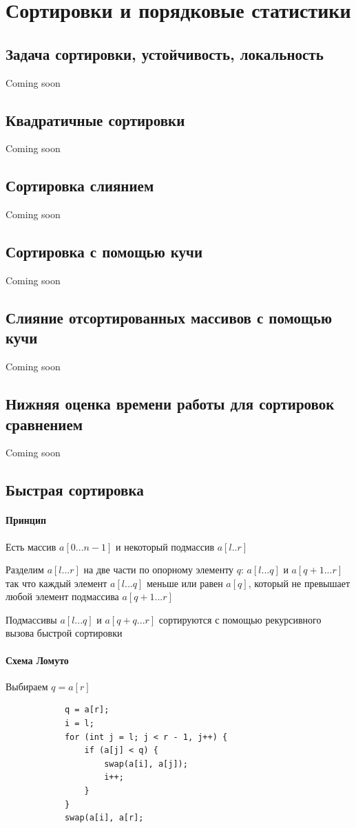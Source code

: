 \documentclass[a4paper,10pt]{article}
\begin{document}
	\section{Сортировки и порядковые статистики}
	\subsection{Задача сортировки, устойчивость, локальность}
	Coming soon
	\subsection{Квадратичные сортировки}
	Coming soon
	\subsection{Сортировка слиянием}
	Coming soon
	\subsection{Сортировка с помощью кучи}
	Coming soon	
	\subsection{Слияние отсортированных массивов с помощью кучи}
	Coming soon	
	\subsection{Нижняя оценка времени работы для сортировок сравнением}
	Coming soon
	\subsection{Быстрая сортировка}
	\paragraph{Принцип}
	Есть массив $a[0...n-1]$ и некоторый подмассив $a[l..r]$
	\begin{center}
		\item Разделим $a[l...r]$ на две части по опорному элементу $q$: $a[l...q]$ и $a[q+1...r]$ так что каждый элемент $a[l...q]$ меньше или равен $a[q]$, который не превышает любой элемент подмассива $a[q+1...r]$
		\item Подмассивы $a[l...q]$ и $a[q+q...r]$ сортируются с помощью рекурсивного вызова быстрой сортировки
	\end{center}
	\paragraph{Схема Ломуто}
	\begin{center}
		\item Выбираем $q = a[r]$
		\begin{lstlisting}
			q = a[r];
			i = l;
			for (int j = l; j < r - 1, j++) {
				if (a[j] < q) {
					swap(a[i], a[j]);
					i++;
				}
			}
			swap(a[i], a[r];
		\end{lstlisting}
	\end{center}
	\newpage
\end{document}

